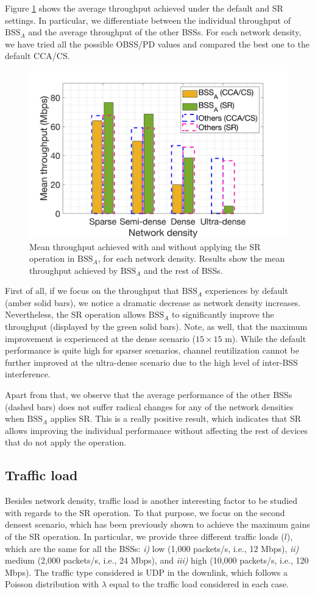 \documentclass{article}
\begin{document}
Figure \ref{fig:SIM_2_1} shows the average throughput achieved under the default and SR settings. In particular, we differentiate between the individual throughput of $\text{BSS}_A$ and the average throughput of the other BSSs. For each network density, we have tried all the possible OBSS/PD values and compared the best one to the default CCA/CS.

\begin{figure}[ht!]
	\centering		
	\includegraphics[width=.6\textwidth]{SIM_2_1}
	\caption{Mean throughput achieved with and without applying the SR operation in $\text{BSS}_A$, for each network density. Results show the mean throughput achieved by $\text{BSS}_A$ and the rest of BSSs.}
	\label{fig:SIM_2_1}
\end{figure}

First of all, if we focus on the throughput that $\text{BSS}_A$ experiences by default (amber solid bars), we notice a dramatic decrease as network density increases. Nevertheless, the SR operation allows $\text{BSS}_A$ to significantly improve the throughput (displayed by the green solid bars). Note, as well, that the maximum improvement is experienced at the dense scenario ($15\times15$ m). While the default performance is quite high for sparser scenarios, channel reutilization cannot be further improved at the ultra-dense scenario due to the high level of inter-BSS interference.

Apart from that, we observe that the average performance of the other BSSs (dashed bars) does not suffer radical changes for any of the network densities when $\text{BSS}_A$ applies SR. This is a really positive result, which indicates that SR allows improving the individual performance without affecting the rest of devices that do not apply the operation.

\subsection{Traffic load}
\label{section:random_scenarios_traffic_load}
Besides network density, traffic load is another interesting factor to be studied with regards to the SR operation. To that purpose, we focus on the second densest scenario, which has been previously shown to achieve the maximum gains of the SR operation. In particular, we provide three different traffic loads ($l$), which are the same for all the BSSs: \emph{i)} low (1,000 packets/s, i.e., 12 Mbps), \emph{ii)} medium (2,000 packets/s, i.e., 24 Mbps), and \emph{iii)} high (10,000 packets/s, i.e., 120 Mbps). The traffic type considered is UDP in the downlink, which follows a Poisson distribution with $\lambda$ equal to the traffic load considered in each case.
\end{document}
